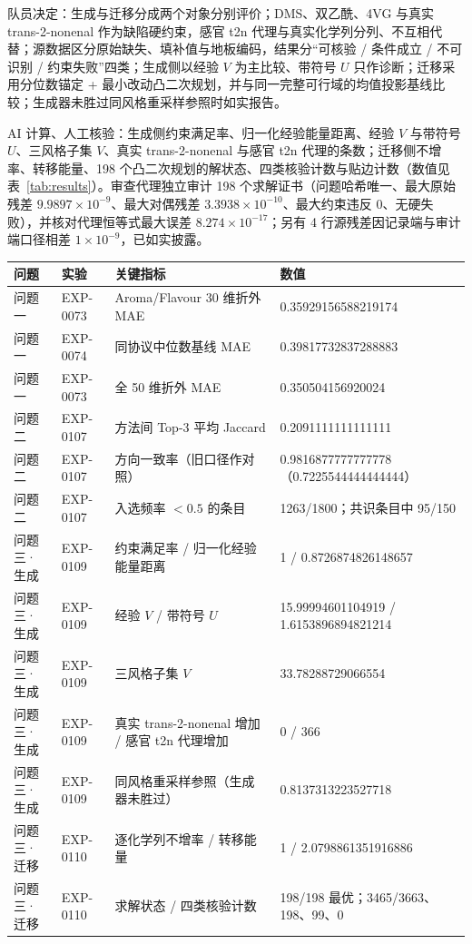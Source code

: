 \documentclass[11pt,a4paper]{article}
\renewcommand{\arraystretch}{1.12}
\begin{document}
队员决定：生成与迁移分成两个对象分别评价；DMS、双乙酰、4VG 与真实 trans-2-nonenal 作为缺陷硬约束，感官 t2n 代理与真实化学列分列、不互相代替；源数据区分原始缺失、填补值与地板编码，结果分“可核验 / 条件成立 / 不可识别 / 约束失败”四类；生成侧以经验 $V$ 为主比较、带符号 $U$ 只作诊断；迁移采用分位数锚定 + 最小改动凸二次规划，并与同一完整可行域的均值投影基线比较；生成器未胜过同风格重采样参照时如实报告。

AI 计算、人工核验：生成侧约束满足率、归一化经验能量距离、经验 $V$ 与带符号 $U$、三风格子集 $V$、真实 trans-2-nonenal 与感官 t2n 代理的条数；迁移侧不增率、转移能量、198 个凸二次规划的解状态、四类核验计数与贴边计数（数值见表~\ref{tab:results}）。审查代理独立审计 198 个求解证书（问题哈希唯一、最大原始残差 $9.9897\times10^{-9}$、最大对偶残差 $3.3938\times10^{-10}$、最大约束违反 0、无硬失败），并核对代理恒等式最大误差 $8.274\times10^{-17}$；另有 4 行源残差因记录端与审计端口径相差 $1\times10^{-9}$，已如实披露。

\begin{center}
\begin{minipage}{\linewidth}
\centering
\renewcommand{\arraystretch}{1.04}
\footnotesize
\begin{tabular}{@{}p{2.3cm}p{2.0cm}p{4.9cm}p{6.0cm}@{}}
\toprule
问题 & 实验 & 关键指标 & 数值 \\
\midrule
问题一 & EXP-0073 & Aroma/Flavour 30 维折外 MAE & 0.35929156588219174 \\
问题一 & EXP-0074 & 同协议中位数基线 MAE & 0.39817732837288883 \\
问题一 & EXP-0073 & 全 50 维折外 MAE & 0.350504156920024 \\
问题二 & EXP-0107 & 方法间 Top-3 平均 Jaccard & 0.2091111111111111 \\
问题二 & EXP-0107 & 方向一致率（旧口径作对照） & 0.9816877777777778（0.7225544444444444） \\
问题二 & EXP-0107 & 入选频率 $<0.5$ 的条目 & 1263/1800；共识条目中 95/150 \\
问题三·生成 & EXP-0109 & 约束满足率 / 归一化经验能量距离 & 1 / 0.8726874826148657 \\
问题三·生成 & EXP-0109 & 经验 $V$ / 带符号 $U$ & 15.99994601104919 / 1.6153896894821214 \\
问题三·生成 & EXP-0109 & 三风格子集 $V$ & 33.78288729066554 \\
问题三·生成 & EXP-0109 & 真实 trans-2-nonenal 增加 / 感官 t2n 代理增加 & 0 / 366 \\
问题三·生成 & EXP-0109 & 同风格重采样参照（生成器未胜过） & 0.8137313223527718 \\
问题三·迁移 & EXP-0110 & 逐化学列不增率 / 转移能量 & 1 / 2.0798861351916886 \\
问题三·迁移 & EXP-0110 & 求解状态 / 四类核验计数 & 198/198 最优；3465/3663、198、99、0 \\
\bottomrule
\end{tabular}
\end{minipage}
\end{center}
\end{document}
